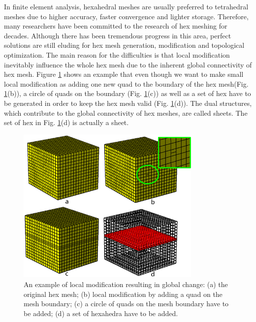 \documentclass[final,5p,times,twocolumn]{elsarticle}
\begin{document}
In finite element analysis, hexahedral meshes are usually preferred to tetrahedral meshes due to higher accuracy, faster convergence and lighter storage\cite{Shepherd:2007tg,Shepherd:2008dg}. Therefore, many researchers have been committed to the research of hex meshing for decades. Although there has been tremendous progress in this area, perfect solutions are still eluding for hex mesh generation, modification and topological optimization. The main reason for the difficulties is that local modification inevitably influence the whole hex mesh due to the inherent global connectivity of hex mesh\cite{Murdoch:1997fy, Tautges:2003vt, Ledoux:2009cg, Ramos:2014jq}. Figure \ref{fig:global_structure} shows an example that even though we want to make small local modification as adding one new quad to the boundary of the hex mesh(Fig. \ref{fig:global_structure}(b)), a circle of quads on the boundary (Fig. \ref{fig:global_structure}(c)) as well as a set of hex have to be generated in order to keep the hex mesh valid (Fig. \ref{fig:global_structure}(d)). The dual structures, which contribute to the global connectivity of hex meshes, are called sheets. The set of hex in Fig. \ref{fig:global_structure}(d) is actually a sheet.

\begin{figure}[htbp]
\begin{center}
\includegraphics[width=9cm]{global_structure.png}
\caption{An example of local modification resulting in global change: (a) the original hex mesh; (b) local modification by adding a quad on the mesh boundary; (c) a circle of quads on the mesh boundary have to be added; (d) a set of hexahedra have to be added.}
\label{fig:global_structure}
\end{center}
\end{figure}
\end{document}
